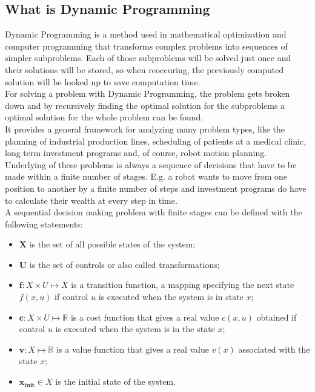 \documentclass[conference]{IEEEtran}
\begin{document}
\subsection{What is Dynamic Programming}
Dynamic Programming is a method used in mathematical optimization and computer programming that transforms complex problems into sequences of simpler subproblems. Each of those subproblems will be solved just once and their solutions will be stored, so when reoccuring, the previously computed solution will be looked up to save computation time.
\\
For solving a problem with Dynamic Programming, the problem gets broken down and by recursively finding the optimal solution for the subproblems a optimal solution for the whole problem can be found.
\\
It provides a general framework for analyzing many problem types, like the planning of industrial production lines, scheduling of patients at a medical clinic, long term investment programs and, of course, robot motion planning.
\\
Underlying of these problems is always a sequence of decisions that have to be made within a finite number of stages. E.g. a robot wants to move from one position to another by a finite number of steps and investment programs do have to calculate their wealth at every step in time.\\
A sequential decision making problem with finite stages can be defined with the following statements:
\begin{itemize}
\item $\mathbf{X}$ is the set of all possible states of the system;
\item $\mathbf{U}$ is the set of controls or also called transformations;
\item $\mathbf{f}: X \times U \mapsto X$ is a transition function, a mapping specifying the next state $f(x,u)$ if control $u$ is executed when the system is in state $x$;
\item $\mathbf{c}: X \times U \mapsto \mathbb{R}$ is a cost function that gives a real value $c(x, u)$ obtained if control $u$ is executed when the system is in the state $x$;
\item $\mathbf{v}: X \mapsto \mathbb{R}$ is a value function that gives a real value $v(x)$ associated with the state $x$;
\item $\mathbf{x_\text{init}} \in X$ is the initial state of the system. \cite{OktayArslan.December2015}
\end{itemize}
\end{document}
